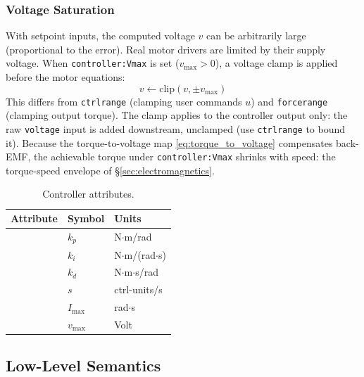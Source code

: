 \documentclass[10pt, a4paper, twocolumn]{article}
\let\oldtexttt\texttt
\renewcommand{\texttt}[1]{{\smaller\oldtexttt{#1}}}
\newcommand{\atVMAX}{\texttt{controller:Vmax}}
\newcommand{\atKP}{\texttt{controller:kp}}
\newcommand{\atKI}{\texttt{controller:ki}}
\newcommand{\atKD}{\texttt{controller:kd}}
\newcommand{\atSLEW}{\texttt{controller:slewmax}}
\newcommand{\atIMAXINT}{\texttt{controller:Imax}}
\begin{document}
\subsubsection{Voltage Saturation}
\label{sec:voltage_saturation}

With setpoint inputs, the computed voltage $v$ can be arbitrarily large (proportional to the error). Real motor drivers are limited by their supply voltage. When \atVMAX{} is set ($v_{\max} > 0$), a voltage clamp is applied before the motor equations:
\begin{equation*}
  v \leftarrow \text{clip}(v, \pm v_{\max})
  \label{eq:vlimit}
\end{equation*}
This differs from \texttt{ctrlrange} (clamping user commands $u$) and \texttt{forcerange} (clamping output torque). The clamp applies to the controller output only: the raw \texttt{voltage} input is added downstream, unclamped (use \texttt{ctrlrange} to bound it). Because the torque-to-voltage map \eqref{eq:torque_to_voltage} compensates back-EMF, the achievable torque under \atVMAX{} shrinks with speed: the torque-speed envelope of \S\ref{sec:electromagnetics}.

\begin{table}[H]
\centering
\small
\begin{tabular}{@{}lll@{}}
\toprule
Attribute & Symbol & Units \\
\midrule
\atKP{} & $k_p$ & N$\cdot$m/rad \\
\atKI{} & $k_i$ & N$\cdot$m/(rad$\cdot$s) \\
\atKD{} & $k_d$ & N$\cdot$m$\cdot$s/rad \\
\atSLEW{} & $s$ & ctrl-units/s \\
\atIMAXINT{} & $I_{\max}$ & rad$\cdot$s \\
\atVMAX{} & $v_{\max}$ & Volt \\
\bottomrule
\end{tabular}
\caption{Controller attributes.}
\label{tab:controller_attrs}
\end{table}

\vfill\newpage

\subsection{Low-Level Semantics}
\label{sec:array_semantics}
\end{document}
